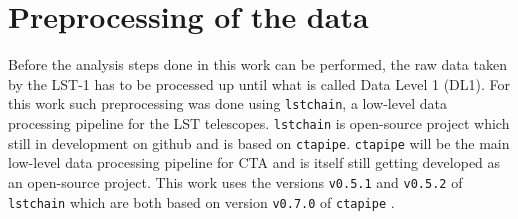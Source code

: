 \chapter{Preprocessing of the data}
\label{ch:prepro}

Before the analysis steps done in this work can be performed, the raw data taken by the LST-1 has to be processed up until what is called Data Level 1 (DL1).
For this work such preprocessing was done using \texttt{lstchain}, a low-level data processing pipeline for the LST telescopes. 
\texttt{lstchain} is open-source project which still in development on github \cite{lstchain} and is based on \texttt{ctapipe}. 
\texttt{ctapipe} will be the main low-level data processing pipeline for CTA and is itself still getting developed as an open-source project.
This work uses the versions \texttt{v0.5.1} and \texttt{v0.5.2} of \texttt{lstchain} which are both based on version \texttt{v0.7.0} of \texttt{ctapipe} \cite{ctapipe}. 

